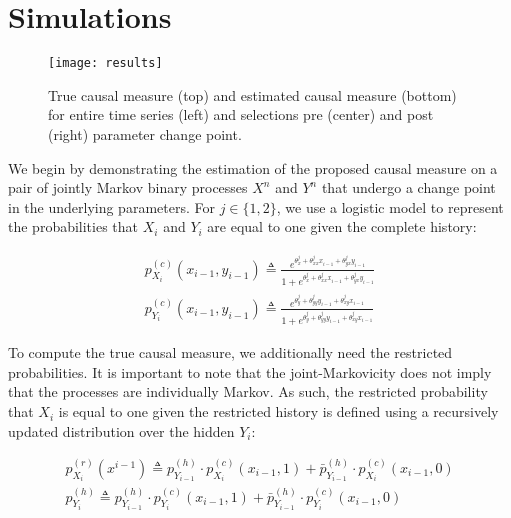 \section{Simulations} \label{simulations}

\begin{comment}
- Application to conditional bernoulli model using CTW algorithm (Fig 1)
- Explicit derivation of bounds and computation of regret
- Use changing environment meta algorithm for changing parameters to demonstrate that it appears to work even though theorem doesn't apply (Fig 2)
\end{comment}

\begin{figure*}
\texttt{[image: results]}
\caption{True causal measure (top) and estimated causal measure (bottom) for entire time series (left) and selections pre (center) and post (right) parameter change point.}
\label{fig:results}
\end{figure*}

We begin by demonstrating the estimation of the proposed causal measure on a pair of jointly Markov binary processes $X^n$ and $Y^n$ that undergo a change point in the underlying parameters. For $j\in \{1,2\}$, we use a logistic model to represent the probabilities that $X_i$ and $Y_i$ are equal to one given the complete history:

\begin{align}
p_{X_i}^{(c)}(x_{i-1},y_{i-1}) \triangleq
\frac{e^{\theta^j_x+\theta^j_{xx}x_{i-1}+\theta^j_{yx}y_{i-1}}}
{1+e^{\theta^j_x + \theta^j_{xx}x_{i-1}+ \theta^j_{yx}y_{i-1}}} \\
p_{Y_i}^{(c)}(x_{i-1},y_{i-1}) \triangleq
\frac{e^{\theta^j_y + \theta^j_{yy}y_{i-1}+ \theta^j_{xy}x_{i-1}}}
{1+e^{\theta^j_y + \theta^j_{yy}y_{i-1}+ \theta^j_{xy}x_{i-1}}}
\end{align}

\noindent To compute the true causal measure, we additionally need the restricted probabilities. It is important to note that the joint-Markovicity does not imply that the processes are individually Markov. As such, the restricted probability that $X_i$ is equal to one given the restricted history is defined using a recursively updated distribution over the hidden $Y_i$:

\begin{eqnarray}
p_{X_i}^{(r)}(x^{i-1}) \triangleq
p^{(h)}_{Y_{i-1}}\cdot p_{X_i}^{(c)}(x_{i-1},1) +
\bar{p}^{(h)}_{Y_{i-1}}\cdot p_{X_i}^{(c)}(x_{i-1},0)
\\
p^{(h)}_{Y_i} \triangleq
p^{(h)}_{Y_{i-1}}\cdot p_{Y_i}^{(c)}(x_{i-1},1) +
\bar{p}^{(h)}_{Y_{i-1}}\cdot p_{Y_i}^{(c)}(x_{i-1},0)
\end{eqnarray}

